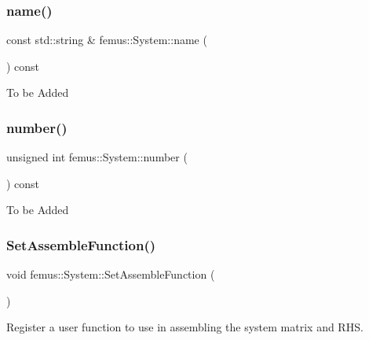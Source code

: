 \subsubsection{\texorpdfstring{name()}{name()}}
{\footnotesize\ttfamily const std\+::string \& femus\+::\+System\+::name (\begin{DoxyParamCaption}{ }\end{DoxyParamCaption}) const\hspace{0.3cm}{\ttfamily [inline]}}

To be Added \mbox{\label{classfemus_1_1_system_a28f5c7f6286dd597ae28a8923c8dca11}} 
\subsubsection{\texorpdfstring{number()}{number()}}
{\footnotesize\ttfamily unsigned int femus\+::\+System\+::number (\begin{DoxyParamCaption}{ }\end{DoxyParamCaption}) const\hspace{0.3cm}{\ttfamily [inline]}}

To be Added \mbox{\label{classfemus_1_1_system_a42a5b5b5d2c7673b1d4c896762d8db9e}} 
\subsubsection{\texorpdfstring{Set\+Assemble\+Function()}{SetAssembleFunction()}}
{\footnotesize\ttfamily void femus\+::\+System\+::\+Set\+Assemble\+Function (\begin{DoxyParamCaption}\item[{\mbox{\hyperlink{classfemus_1_1_system_ae71fa78abbc4b3efe8ef1dc057275b9b}{Assemble\+Function\+Type}}  }]{ }\end{DoxyParamCaption})}

Register a user function to use in assembling the system matrix and R\+HS. \mbox{\label{classfemus_1_1_system_a04558397f2ff92fc658579c7f8fdf882}} 

